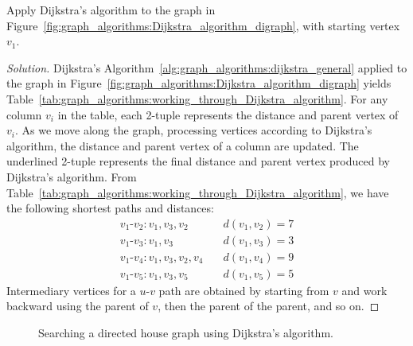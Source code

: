 \begin{example}
Apply Dijkstra's algorithm to the graph in
Figure~\ref{fig:graph_algorithms:Dijkstra_algorithm_digraph}, with
starting vertex $v_1$.
\end{example}

\begin{proof}[Solution]
Dijkstra's Algorithm~\ref{alg:graph_algorithms:dijkstra_general}
applied to the graph in
Figure~\ref{fig:graph_algorithms:Dijkstra_algorithm_digraph} yields
Table~\ref{tab:graph_algorithms:working_through_Dijkstra_algorithm}. For
any column $v_i$ in the table, each 2-tuple represents the distance
and parent vertex of $v_i$. As we move along the graph, processing
vertices according to Dijkstra's algorithm, the distance and parent
vertex of a column are updated. The underlined 2-tuple represents the
final distance and parent vertex produced by Dijkstra's
algorithm. From
Table~\ref{tab:graph_algorithms:working_through_Dijkstra_algorithm},
we have the following shortest paths and distances:
\[
\begin{array}{ll}
v_1\text{-}v_2: v_1, v_3, v_2      &\quad d(v_1, v_2) = 7 \\[4pt]
v_1\text{-}v_3: v_1, v_3           &\quad d(v_1, v_3) = 3 \\[4pt]
v_1\text{-}v_4: v_1, v_3, v_2, v_4 &\quad d(v_1, v_4) = 9 \\[4pt]
v_1\text{-}v_5: v_1, v_3, v_5      &\quad d(v_1, v_5) = 5
\end{array}
\]
Intermediary vertices for a $u$-$v$ path are obtained by starting from
$v$ and work backward using the parent of $v$, then the parent of the
parent, and so on.
\end{proof}

\begin{figure}[!htbp]
\centering
{}
\caption{Searching a directed house graph using Dijkstra's algorithm.}
\label{fig:graph_algorithms:Dijkstra_directed_house_graph}
\end{figure}

